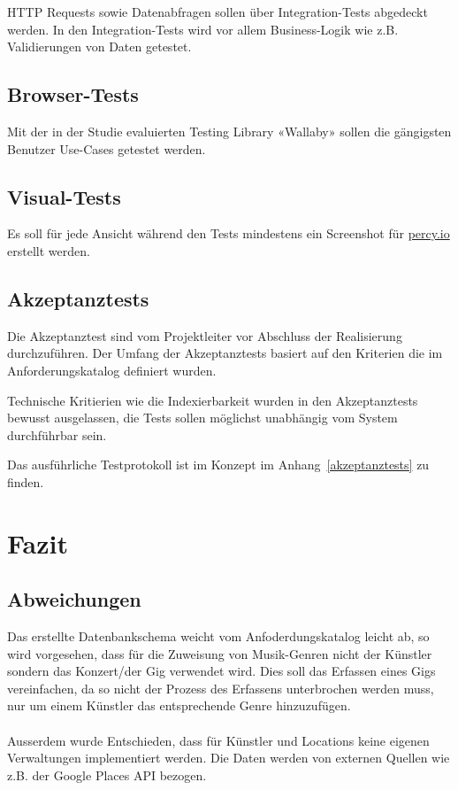 HTTP Requests sowie Datenabfragen sollen über Integration-Tests abgedeckt
werden. In den Integration-Tests wird vor allem Business-Logik wie z.B.
Validierungen von Daten getestet.

\subsection{Browser-Tests}

Mit der in der Studie evaluierten Testing Library «Wallaby» sollen die
gängigsten Benutzer Use-Cases getestet werden.

\subsection{Visual-Tests}

Es soll für jede Ansicht während den Tests mindestens ein Screenshot für
\href{https://percy.io/}{percy.io} erstellt werden.

\subsection{Akzeptanztests}

Die Akzeptanztest sind vom Projektleiter vor Abschluss der Realisierung
durchzuführen. Der Umfang der Akzeptanztests basiert auf den Kriterien die im
Anforderungskatalog definiert wurden.

Technische Kritierien wie die Indexierbarkeit wurden in den Akzeptanztests
bewusst ausgelassen, die Tests sollen möglichst unabhängig vom System
durchführbar sein.

Das ausführliche Testprotokoll ist im Konzept im Anhang~\ref{akzeptanztests} zu finden.

\clearpage
\section{Fazit}

\subsection{Abweichungen}

Das erstellte Datenbankschema weicht vom Anfoderdungskatalog leicht ab,
so wird vorgesehen, dass für die Zuweisung von Musik-Genren nicht der Künstler
sondern das Konzert/der Gig verwendet wird.
Dies soll das Erfassen eines Gigs vereinfachen, da so nicht der Prozess des
Erfassens unterbrochen werden muss, nur um einem Künstler das entsprechende
Genre hinzuzufügen.\\
\\
Ausserdem wurde Entschieden, dass für Künstler und Locations keine eigenen
Verwaltungen implementiert werden. Die Daten werden von externen Quellen
wie z.B. der Google Places API bezogen.

